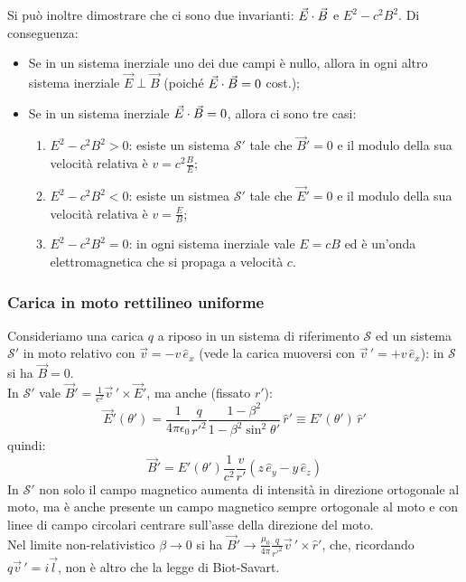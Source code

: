 Si può inoltre dimostrare che ci sono due invarianti: $ \vec{E}\cdot\vec{B} $ e $ E^2 - c^2B^2 $. Di conseguenza:
\begin{itemize}
	\item Se in un sistema inerziale uno dei due campi è nullo, allora in ogni altro sistema inerziale $ \vec{E}\perp\vec{B} $ (poiché $ \vec{E}\cdot\vec{B} = 0 $ cost.);
	\item Se in un sistema inerziale $ \vec{E}\cdot\vec{B} = 0 $, allora ci sono tre casi:
	\begin{enumerate}
		\item $ E^2 - c^2B^2 > 0 $: esiste un sistema $ \mathcal{S}' $ tale che $ \vec{B}' = 0 $ e il modulo della sua velocità relativa è $ v = c^2 \frac{B}{E} $;
		\item $ E^2 - c^2B^2 < 0 $: esiste un sistmea $ \mathcal{S}' $ tale che $ \vec{E}' = 0 $ e il modulo della sua velocità relativa è $ v = \frac{E}{B} $;
		\item $ E^2 - c^2B^2 = 0 $: in ogni sistema inerziale vale $ E = c B $ ed è un'onda elettromagnetica che si propaga a velocità $ c $.
	\end{enumerate}
\end{itemize}

\subsubsection{Carica in moto rettilineo uniforme}

Consideriamo una carica $ q $ a riposo in un sistema di riferimento $ \mathcal{S} $ ed un sistema $ \mathcal{S}' $ in moto relativo con $ \vec{v} = -v\,\hat{e}_x $ (vede la carica muoversi con $ \vec{v}\,' = +v\,\hat{e}_x $): in $ \mathcal{S} $ si ha $ \vec{B} = 0 $. \\ 
In $ \mathcal{S}' $ vale $ \vec{B}' = \frac{1}{c^2} \vec{v}\,'\times\vec{E}' $, ma anche (fissato $ r' $):
\begin{equation}
	\vec{E}'(\theta') = \frac{1}{4\pi\epsilon_0} \frac{q}{r'^2} \frac{1 - \beta^2}{1 - \beta^2\sin^2\theta'} \,\hat{r}' \equiv E'(\theta') \,\hat{r}'
	\label{eq:47}
\end{equation}
quindi:
\begin{equation}
	\vec{B}' = E'(\theta')\frac{1}{c^2}\frac{v}{r'} (z\,\hat{e}_y - y\,\hat{e}_z)
	\label{eq:48}
\end{equation}
In $ \mathcal{S}' $ non solo il campo magnetico aumenta di intensità in direzione ortogonale al moto, ma è anche presente un campo magnetico sempre ortogonale al moto e con linee di campo circolari centrare sull'asse della direzione del moto. \\ 
Nel limite non-relativistico $ \beta \rightarrow 0 $ si ha $ \vec{B}' \rightarrow \frac{\mu_0}{4\pi}\frac{q}{r'^2}\vec{v}\,'\times\hat{r}' $, che, ricordando $ q\vec{v}\,' = i \vec{l} $, non è altro che la legge di Biot-Savart.

